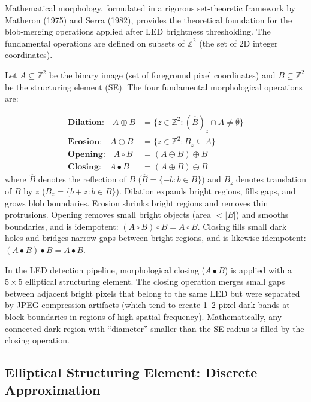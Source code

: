 Mathematical morphology, formulated in a rigorous set-theoretic framework by Matheron (1975) and Serra (1982), provides the theoretical foundation for the blob-merging operations applied after LED brightness thresholding. The fundamental operations are defined on subsets of $\mathbb{Z}^2$ (the set of 2D integer coordinates).

Let $A \subseteq \mathbb{Z}^2$ be the binary image (set of foreground pixel coordinates) and $B \subseteq \mathbb{Z}^2$ be the structuring element (SE). The four fundamental morphological operations are:

\begin{eqblock}
\begin{align}
\textbf{Dilation:}\quad A \oplus B &= \{ z \in \mathbb{Z}^2 : (\hat B)_z \cap A \neq \emptyset \} \\
\textbf{Erosion:}\quad A \ominus B &= \{ z \in \mathbb{Z}^2 : B_z \subseteq A \} \\
\textbf{Opening:}\quad A \circ B &= (A \ominus B) \oplus B \\
\textbf{Closing:}\quad A \bullet B &= (A \oplus B) \ominus B
\end{align}
where $\hat B$ denotes the reflection of $B$ ($\hat B = \{-b : b \in B\}$) and $B_z$ denotes translation of $B$ by $z$ ($B_z = \{b+z : b \in B\}$). Dilation expands bright regions, fills gaps, and grows blob boundaries. Erosion shrinks bright regions and removes thin protrusions. Opening removes small bright objects (area $<|B|$) and smooths boundaries, and is idempotent: $(A\circ B)\circ B = A\circ B$. Closing fills small dark holes and bridges narrow gaps between bright regions, and is likewise idempotent: $(A\bullet B)\bullet B = A\bullet B$.
\end{eqblock}

In the LED detection pipeline, morphological closing ($A \bullet B$) is applied with a $5\times5$ elliptical structuring element. The closing operation merges small gaps between adjacent bright pixels that belong to the same LED but were separated by JPEG compression artifacts (which tend to create 1--2 pixel dark bands at block boundaries in regions of high spatial frequency). Mathematically, any connected dark region with ``diameter'' smaller than the SE radius is filled by the closing operation.

\subsection{Elliptical Structuring Element: Discrete Approximation}

